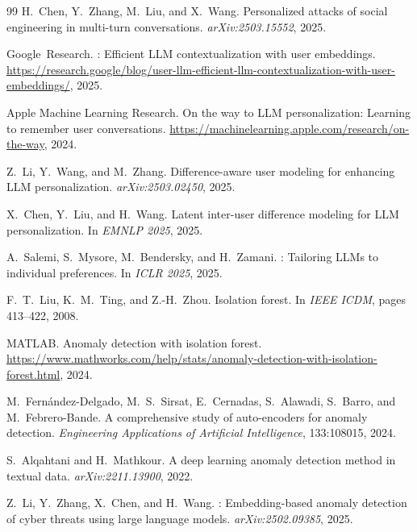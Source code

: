 \documentclass[conference]{IEEEtran}
\begin{document}
\begin{thebibliography}{99}
H.~Chen, Y.~Zhang, M.~Liu, and X.~Wang.
\newblock Personalized attacks of social engineering in multi-turn conversations.
\newblock \emph{arXiv:2503.15552}, 2025.

Google~Research.
: Efficient {LLM} contextualization with user embeddings.
\newblock \url{https://research.google/blog/user-llm-efficient-llm-contextualization-with-user-embeddings/}, 2025.

Apple Machine Learning Research.
\newblock On the way to {LLM} personalization: Learning to remember user conversations.
\newblock \url{https://machinelearning.apple.com/research/on-the-way}, 2024.

Z.~Li, Y.~Wang, and M.~Zhang.
\newblock Difference-aware user modeling for enhancing {LLM} personalization.
\newblock \emph{arXiv:2503.02450}, 2025.

X.~Chen, Y.~Liu, and H.~Wang.
\newblock Latent inter-user difference modeling for {LLM} personalization.
\newblock In \emph{EMNLP 2025}, 2025.

A.~Salemi, S.~Mysore, M.~Bendersky, and H.~Zamani.
: Tailoring {LLMs} to individual preferences.
\newblock In \emph{ICLR 2025}, 2025.

F.~T.~Liu, K.~M.~Ting, and Z.-H.~Zhou.
\newblock Isolation forest.
\newblock In \emph{IEEE ICDM}, pages 413--422, 2008.

MATLAB.
\newblock Anomaly detection with isolation forest.
\newblock \url{https://www.mathworks.com/help/stats/anomaly-detection-with-isolation-forest.html}, 2024.

M.~Fern\'{a}ndez-Delgado, M.~S.~Sirsat, E.~Cernadas, S.~Alawadi, S.~Barro,
  and M.~Febrero-Bande.
\newblock A comprehensive study of auto-encoders for anomaly detection.
\newblock \emph{Engineering Applications of Artificial Intelligence}, 133:108015, 2024.

S.~Alqahtani and H.~Mathkour.
\newblock A deep learning anomaly detection method in textual data.
\newblock \emph{arXiv:2211.13900}, 2022.

Z.~Li, Y.~Zhang, X.~Chen, and H.~Wang.
: Embedding-based anomaly detection of cyber threats using large
  language models.
\newblock \emph{arXiv:2502.09385}, 2025.


\end{thebibliography}
\end{document}
